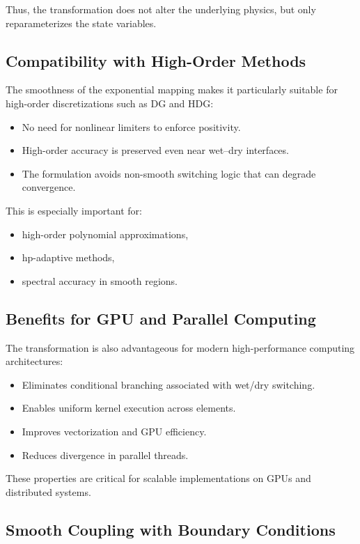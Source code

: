 \documentclass[11pt]{article}
\begin{document}
Thus, the transformation does not alter the underlying physics, but only reparameterizes the state variables.

\subsection{Compatibility with High-Order Methods}

The smoothness of the exponential mapping makes it particularly suitable for high-order discretizations such as DG and HDG:
\begin{itemize}[leftmargin=2em]
    \item No need for nonlinear limiters to enforce positivity.
    \item High-order accuracy is preserved even near wet--dry interfaces.
    \item The formulation avoids non-smooth switching logic that can degrade convergence.
\end{itemize}

This is especially important for:
\begin{itemize}[leftmargin=2em]
    \item high-order polynomial approximations,
    \item hp-adaptive methods,
    \item spectral accuracy in smooth regions.
\end{itemize}

\subsection{Benefits for GPU and Parallel Computing}

The transformation is also advantageous for modern high-performance computing architectures:
\begin{itemize}[leftmargin=2em]
    \item Eliminates conditional branching associated with wet/dry switching.
    \item Enables uniform kernel execution across elements.
    \item Improves vectorization and GPU efficiency.
    \item Reduces divergence in parallel threads.
\end{itemize}

These properties are critical for scalable implementations on GPUs and distributed systems.

\subsection{Smooth Coupling with Boundary Conditions}
\end{document}

